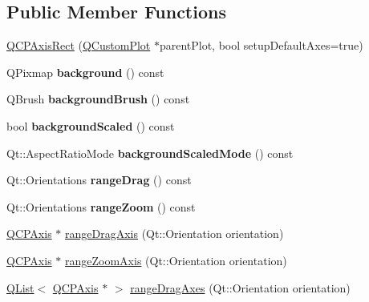\subsection*{Public Member Functions}
\begin{DoxyCompactItemize}
\item 
\hyperlink{class_q_c_p_axis_rect_a60b31dece805462c1b82eea2e69ba042}{Q\+C\+P\+Axis\+Rect} (\hyperlink{class_q_custom_plot}{Q\+Custom\+Plot} $\ast$parent\+Plot, bool setup\+Default\+Axes=true)
\item 
\mbox{\label{class_q_c_p_axis_rect_a572deec9c9a4d5987d5c5f78521991e6}} 
Q\+Pixmap {\bfseries background} () const
\item 
\mbox{\label{class_q_c_p_axis_rect_a7d09540e3fef12362d00e6bac92b6453}} 
Q\+Brush {\bfseries background\+Brush} () const
\item 
\mbox{\label{class_q_c_p_axis_rect_a059ede9a5fdcafb5cef280cd65fe4f3a}} 
bool {\bfseries background\+Scaled} () const
\item 
\mbox{\label{class_q_c_p_axis_rect_a06b98faf54b5491bff780294e423d3ff}} 
Qt\+::\+Aspect\+Ratio\+Mode {\bfseries background\+Scaled\+Mode} () const
\item 
\mbox{\label{class_q_c_p_axis_rect_aa3a84c768ad6edd08fd4c5dec176828f}} 
Qt\+::\+Orientations {\bfseries range\+Drag} () const
\item 
\mbox{\label{class_q_c_p_axis_rect_aa0d8414ef040523f8b2d55f0c0bddbee}} 
Qt\+::\+Orientations {\bfseries range\+Zoom} () const
\item 
\hyperlink{class_q_c_p_axis}{Q\+C\+P\+Axis} $\ast$ \hyperlink{class_q_c_p_axis_rect_a6d7c22cfc54fac7a3d6ef80b133a8574}{range\+Drag\+Axis} (Qt\+::\+Orientation orientation)
\item 
\hyperlink{class_q_c_p_axis}{Q\+C\+P\+Axis} $\ast$ \hyperlink{class_q_c_p_axis_rect_a679c63f2b8daccfe6ec5110dce3dd3b6}{range\+Zoom\+Axis} (Qt\+::\+Orientation orientation)
\item 
\hyperlink{class_q_list}{Q\+List}$<$ \hyperlink{class_q_c_p_axis}{Q\+C\+P\+Axis} $\ast$ $>$ \hyperlink{class_q_c_p_axis_rect_aae5f99a044ca911685a306f01b7ff941}{range\+Drag\+Axes} (Qt\+::\+Orientation orientation)

\end{DoxyCompactItemize}

